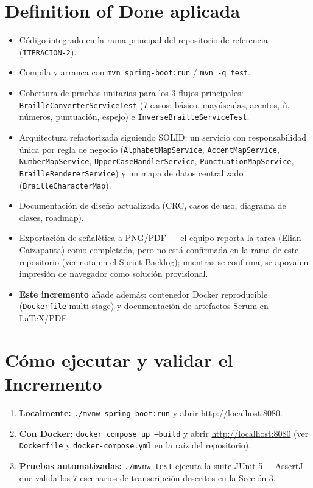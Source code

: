 \documentclass[11pt]{article}
\begin{document}
\section{Definition of Done aplicada}
\begin{itemize}[leftmargin=1.4cm]
  \item[\checkmark] Código integrado en la rama principal del repositorio de referencia
        (\texttt{ITERACION-2}).
  \item[\checkmark] Compila y arranca con \texttt{mvn spring-boot:run} / \texttt{mvn -q test}.
  \item[\checkmark] Cobertura de pruebas unitarias para los 3 flujos principales:
        \texttt{BrailleConverterServiceTest} (7 casos: básico, mayúsculas, acentos, ñ, números,
        puntuación, espejo) e \texttt{InverseBrailleServiceTest}.
  \item[\checkmark] Arquitectura refactorizada siguiendo SOLID: un servicio con responsabilidad única
        por regla de negocio (\texttt{AlphabetMapService}, \texttt{AccentMapService},
        \texttt{NumberMapService}, \texttt{UpperCaseHandlerService}, \texttt{PunctuationMapService},
        \texttt{BrailleRendererService}) y un mapa de datos centralizado (\texttt{BrailleCharacterMap}).
  \item[$\sim$] Documentación de diseño actualizada (CRC, casos de uso, diagrama de clases, roadmap).
  \item[$\sim$] Exportación de señalética a PNG/PDF --- el equipo reporta la tarea (Elian Caizapanta)
        como completada, pero no está confirmada en la rama de este repositorio (ver nota en el Sprint
        Backlog); mientras se confirma, se apoya en impresión de navegador como solución provisional.
  \item[\checkmark] \textbf{Este incremento} añade además: contenedor Docker reproducible
        (\texttt{Dockerfile} multi-stage) y documentación de artefactos Scrum en LaTeX/PDF.
\end{itemize}

\section{Cómo ejecutar y validar el Incremento}
\begin{enumerate}[leftmargin=1.4cm]
  \item \textbf{Localmente:} \texttt{./mvnw spring-boot:run} y abrir \url{http://localhost:8080}.
  \item \textbf{Con Docker:} \texttt{docker compose up --build} y abrir \url{http://localhost:8080}
        (ver \texttt{Dockerfile} y \texttt{docker-compose.yml} en la raíz del repositorio).
  \item \textbf{Pruebas automatizadas:} \texttt{./mvnw test} ejecuta la suite JUnit 5 + AssertJ que
        valida los 7 escenarios de transcripción descritos en la Sección 3.
\end{enumerate}
\end{document}
